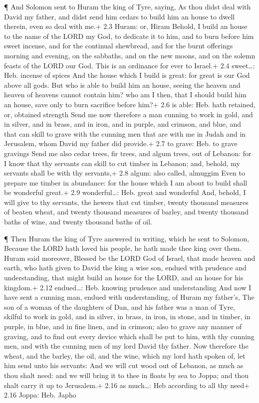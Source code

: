  ¶ And Solomon sent to Huram the king of Tyre, saying, As
thou didst deal with David my father, and didst send him cedars to build
him an house to dwell therein, even so deal with me.+ 2.3 Huram: or,
Hiram  Behold, I build an house to the name of the LORD my
God, to dedicate it to him, and to burn before him sweet incense, and
for the continual shewbread, and for the burnt offerings morning and
evening, on the sabbaths, and on the new moons, and on the solemn feasts
of the LORD our God. This is an ordinance for ever to Israel.+ 2.4
sweet\ldots: Heb. incense of spices  And the house which I
build is great: for great is our God above all gods.  But
who is able to build him an house, seeing the heaven and heaven of
heavens cannot contain him? who am I then, that I should build him an
house, save only to burn sacrifice before him?+ 2.6 is able: Heb. hath
retained, or, obtained strength  Send me now therefore a man
cunning to work in gold, and in silver, and in brass, and in iron, and
in purple, and crimson, and blue, and that can skill to grave with the
cunning men that are with me in Judah and in Jerusalem, whom David my
father did provide.+ 2.7 to grave: Heb. to grave gravings 
Send me also cedar trees, fir trees, and algum trees, out of Lebanon:
for I know that thy servants can skill to cut timber in Lebanon; and,
behold, my servants shall be with thy servants,+ 2.8 algum: also called,
almuggim  Even to prepare me timber in abundance: for the
house which I am about to build shall be wonderful great.+ 2.9
wonderful\ldots: Heb. great and wonderful  And, behold, I
will give to thy servants, the hewers that cut timber, twenty thousand
measures of beaten wheat, and twenty thousand measures of barley, and
twenty thousand baths of wine, and twenty thousand baths of oil.

 ¶ Then Huram the king of Tyre answered in writing, which
he sent to Solomon, Because the LORD hath loved his people, he hath made
thee king over them.  Huram said moreover, Blessed be the
LORD God of Israel, that made heaven and earth, who hath given to David
the king a wise son, endued with prudence and understanding, that might
build an house for the LORD, and an house for his kingdom.+ 2.12
endued\ldots: Heb. knowing prudence and understanding  And
now I have sent a cunning man, endued with understanding, of Huram my
father's,  The son of a woman of the daughters of Dan, and
his father was a man of Tyre, skilful to work in gold, and in silver, in
brass, in iron, in stone, and in timber, in purple, in blue, and in fine
linen, and in crimson; also to grave any manner of graving, and to find
out every device which shall be put to him, with thy cunning men, and
with the cunning men of my lord David thy father.  Now
therefore the wheat, and the barley, the oil, and the wine, which my
lord hath spoken of, let him send unto his servants:  And
we will cut wood out of Lebanon, as much as thou shalt need: and we will
bring it to thee in floats by sea to Joppa; and thou shalt carry it up
to Jerusalem.+ 2.16 as much\ldots: Heb according to all thy need+ 2.16
Joppa: Heb. Japho

